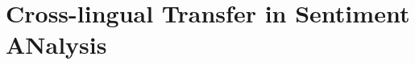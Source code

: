 \chapter{Cross-lingual Transfer in Sentiment ANalysis}
\label{chapter:multilingual_sentiment_analysis_pt2}
